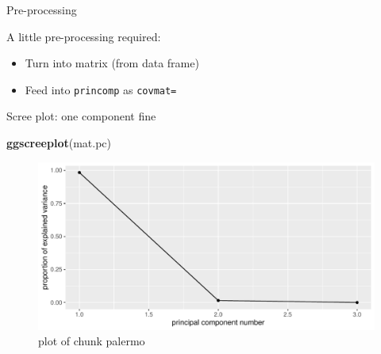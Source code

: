 \documentclass[ignorenonframetext,]{beamer}
\newenvironment{Shaded}{\begin{snugshade}}{\end{snugshade}}
\newcommand{\DataTypeTok}[1]{\textcolor[rgb]{0.13,0.29,0.53}{#1}}
\newcommand{\KeywordTok}[1]{\textcolor[rgb]{0.13,0.29,0.53}{\textbf{#1}}}
\newcommand{\NormalTok}[1]{#1}
\newcommand{\OperatorTok}[1]{\textcolor[rgb]{0.81,0.36,0.00}{\textbf{#1}}}
\newcommand{\StringTok}[1]{\textcolor[rgb]{0.31,0.60,0.02}{#1}}
\begin{document}
\begin{frame}[fragile]{Pre-processing}
\protect\hypertarget{pre-processing}{}

A little pre-processing required:

\begin{itemize}
\item
  Turn into matrix (from data frame)
\item
  Feed into \texttt{princomp} as \texttt{covmat=}
\end{itemize}

\begin{Shaded}
\end{Shaded}

\end{frame}

\begin{frame}[fragile]{Scree plot: one component fine}
\protect\hypertarget{scree-plot-one-component-fine}{}

\begin{Shaded}
\begin{Highlighting}[]
\KeywordTok{ggscreeplot}\NormalTok{(mat.pc)}
\end{Highlighting}
\end{Shaded}

\begin{figure}
\centering
\includegraphics{figure/palermo-1.pdf}
\caption{plot of chunk palermo}
\end{figure}

\end{frame}
\end{document}
